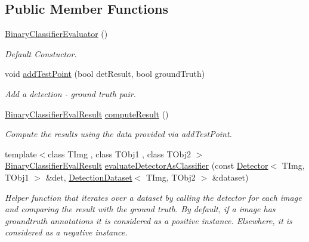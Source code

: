 \subsection*{Public Member Functions}
\begin{DoxyCompactItemize}
\item 
\hypertarget{class_vision_core_1_1_evaluation_1_1_binary_classifier_evaluator_ac752f3567078dfabdfcaf82b272f3040}{}\hyperlink{class_vision_core_1_1_evaluation_1_1_binary_classifier_evaluator_ac752f3567078dfabdfcaf82b272f3040}{Binary\+Classifier\+Evaluator} ()\label{class_vision_core_1_1_evaluation_1_1_binary_classifier_evaluator_ac752f3567078dfabdfcaf82b272f3040}

\begin{DoxyCompactList}\small\item\em Default Constuctor. \end{DoxyCompactList}\item 
\hypertarget{class_vision_core_1_1_evaluation_1_1_binary_classifier_evaluator_af2197d681f638fd535e08c3cc559254a}{}void \hyperlink{class_vision_core_1_1_evaluation_1_1_binary_classifier_evaluator_af2197d681f638fd535e08c3cc559254a}{add\+Test\+Point} (bool det\+Result, bool ground\+Truth)\label{class_vision_core_1_1_evaluation_1_1_binary_classifier_evaluator_af2197d681f638fd535e08c3cc559254a}

\begin{DoxyCompactList}\small\item\em Add a detection -\/ ground truth pair. \end{DoxyCompactList}\item 
\hyperlink{struct_vision_core_1_1_evaluation_1_1_binary_classifier_eval_result}{Binary\+Classifier\+Eval\+Result} \hyperlink{class_vision_core_1_1_evaluation_1_1_binary_classifier_evaluator_ad578be8e9cf0140bf74635da8e5345d4}{compute\+Result} ()
\begin{DoxyCompactList}\small\item\em Compute the results using the data provided via \textquotesingle{}add\+Test\+Point\textquotesingle{}. \end{DoxyCompactList}\item 
{\footnotesize template$<$class T\+Img , class T\+Obj1 , class T\+Obj2 $>$ }\\\hyperlink{struct_vision_core_1_1_evaluation_1_1_binary_classifier_eval_result}{Binary\+Classifier\+Eval\+Result} \hyperlink{class_vision_core_1_1_evaluation_1_1_binary_classifier_evaluator_a40a3e0ed913bf943beefc171ed0162d3}{evaluate\+Detector\+As\+Classifier} (const \hyperlink{class_vision_core_1_1_interfaces_1_1_detector}{Detector}$<$ T\+Img, T\+Obj1 $>$ \&det, \hyperlink{class_vision_core_1_1_evaluation_1_1_detection_dataset}{Detection\+Dataset}$<$ T\+Img, T\+Obj2 $>$ \&dataset)
\begin{DoxyCompactList}\small\item\em Helper function that iterates over a dataset by calling the detector for each image and comparing the result with the ground truth. By default, if a image has groundtruth annotations it is considered as a positive instance. Elsewhere, it is considered as a negative instance. \end{DoxyCompactList}\end{DoxyCompactItemize}
